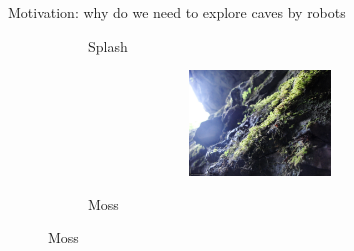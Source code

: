 \documentclass[aspectratio=169,xcolor=table]{beamer}
\begin{document}
\begin{frame}[t]{Motivation: why do we need to explore caves by robots}
\begin{figure}[H]
\begin{subfigure}[b]{0.3\textwidth}
            \caption*{Splash}
            \label{fig:surface_types/splash.png}
        \end{subfigure}
        \hfill
        \begin{subfigure}[b]{0.3\textwidth}
            \centering\includegraphics[height=2.8cm,width=1\textwidth,keepaspectratio]{surface_types/moss.jpg}\\
            \caption*{Moss}
            \label{fig:moss}
        \end{subfigure}
    \end{figure}
\end{frame}
\end{document}
